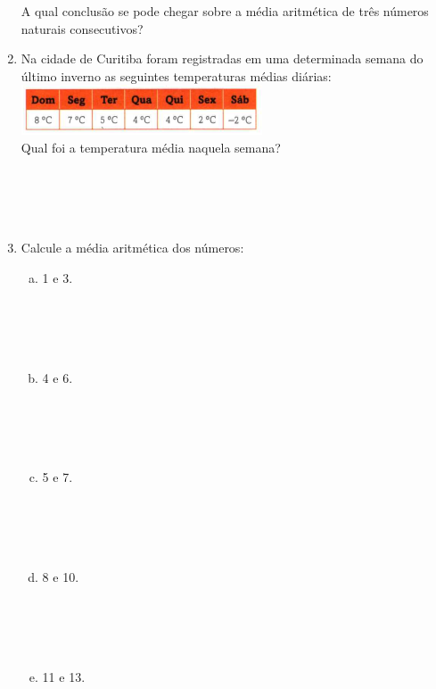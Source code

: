 \documentclass[a4paper,14pt]{article}
\begin{document}
\begin{multicols}{2}
\begin{enumerate}
\begin{enumerate}[a)]
			\end{enumerate}
			A qual conclusão se pode chegar sobre a média aritmética de três números naturais consecutivos? \newpage
			\item Na cidade de Curitiba foram registradas em uma determinada semana do último inverno as seguintes temperaturas médias diárias: \\
			\includegraphics[width=1\linewidth]{6FMA11_imagens/imagem2} \\
			Qual foi a temperatura média naquela semana? \\\\\\\\\\
			\item Calcule a média aritmética dos números:
			\begin{enumerate}[a)]
				\item 1 e 3. \\\\\\\\\\
				\item 4 e 6. \\\\\\\\\\
				\item 5 e 7. \\\\\\\\\\
				\item 8 e 10. \\\\\\\\\\
				\item 11 e 13. \\\\\\\\\\
			\end{enumerate}

\end{enumerate}
\end{multicols}
\end{document}
